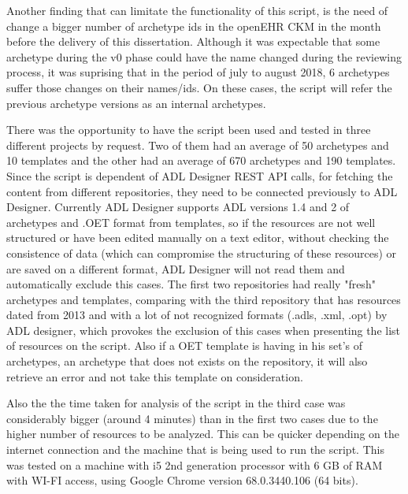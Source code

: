 \documentclass[mim_thesis.tex]{subfiles}
\begin{document}
Another finding that can limitate the functionality of this script, is the need of change a bigger number of archetype ids in the openEHR CKM in the month before the delivery of this dissertation. Although it was expectable that some archetype during the v0 phase could have the name changed during the reviewing process, it was suprising that in the period of july to august 2018, 6 archetypes suffer those changes on their names/ids. On these cases, the script will refer the previous archetype versions as an internal archetypes. 

There was the opportunity to have the script been used and tested in three different projects by request. Two of them had an average of 50 archetypes and 10 templates and the other had an average of 670 archetypes and 190 templates. Since the script is dependent of ADL Designer REST API calls, for fetching the content from different repositories, they need to be connected previously to ADL Designer. Currently ADL Designer supports ADL versions 1.4 and 2 of archetypes and .OET format from templates, so if the resources are not well structured or have been edited manually on a text editor, without checking the consistence of data (which can compromise the structuring of these resources) or are saved on a different format, ADL Designer will not read them and automatically exclude this cases. The first two repositories had really "fresh" archetypes and templates, comparing with the third repository that has resources dated from 2013 and with a lot of not recognized formats (.adls, .xml, .opt) by ADL designer, which provokes the exclusion of this cases when presenting the list of resources on the script. Also if a OET template is having in his set's of archetypes, an archetype that does not exists on the repository, it will also retrieve an error and not take this template on consideration.

Also the the time taken for analysis of the script in the third case was considerably bigger (around 4 minutes) than in the first two cases due to the higher number of resources to be analyzed. This can be quicker depending on the internet connection and the machine that is being used to run the script. This was tested on a machine with i5 2nd generation processor with 6 GB of RAM with WI-FI access, using Google Chrome version 68.0.3440.106 (64 bits).
\end{document}

